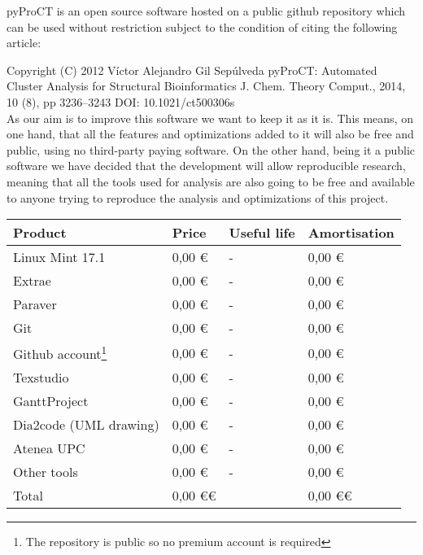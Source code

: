 pyProCT is an open source software hosted on a public github repository which can be used without restriction subject to the condition of citing the following article:

Copyright (C) 2012 Víctor Alejandro Gil Sepúlveda
pyProCT: Automated Cluster Analysis for Structural Bioinformatics
J. Chem. Theory Comput., 2014, 10 (8), pp 3236–3243
DOI: 10.1021/ct500306s \\
As our aim is to improve this software we want to keep it as it is. This means, on one hand, that all the features and optimizations added to it will also be free and public, using no third-party paying software. On the other hand, being it a public software we have decided that the development will allow reproducible research, meaning that all the tools used for analysis are also going to be free and available to anyone trying to reproduce the analysis and optimizations of this project.



\begin{center}
	\begin{tabular}{| R{4cm} | L{3cm} | L{2cm} | L{3cm} |}
	\hline
	Product & Price & Useful life & Amortisation \\ 
	\hline \hline
	Linux Mint 17.1 & 0,00 \euro & - & 0,00 \euro \\
	\hline
	Extrae & 0,00 \euro & - & 0,00 \euro \\
	\hline
	Paraver & 0,00 \euro & - & 0,00 \euro \\
	\hline
	Git & 0,00 \euro& - & 0,00 \euro \\
	\hline
	Github account\footnote{ The repository is public so no premium account is required}& 0,00 \euro & - & 0,00 \euro \\
	\hline
	Texstudio & 0,00 \euro & - & 0,00 \euro \\
	\hline
	GanttProject & 0,00 \euro & - & 0,00 \euro \\
	\hline
	Dia2code (UML drawing)& 0,00 \euro & - & 0,00 \euro \\
	\hline
	Atenea UPC& 0,00 \euro & - & 0,00 \euro \\
	\hline
	Other tools & 0,00 \euro & - & 0,00 \euro \\
	\hline
	\hline
	Total & 0,00 \euro \euro & & 0,00 \euro \euro \\
	\hline
	\end{tabular}
\end{center}



